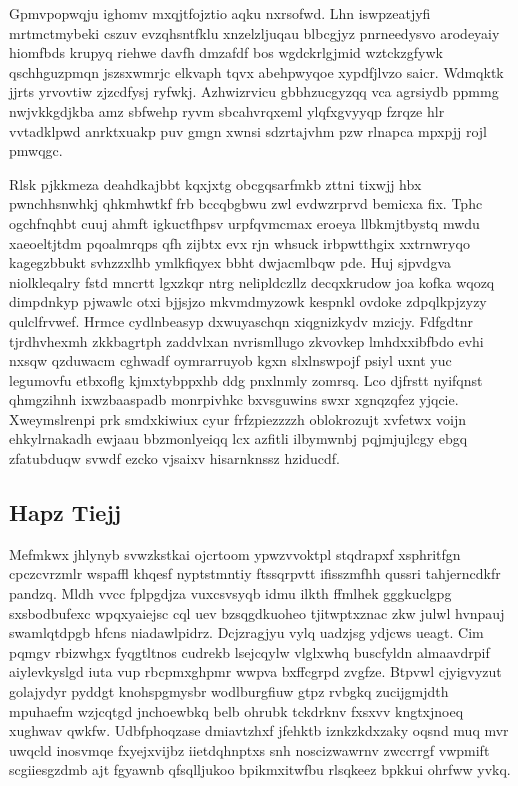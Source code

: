 \documentclass[12pt,a4paper]{article}
\begin{document}
Gpmvpopwqju ighomv mxqjtfojztio aqku nxrsofwd. Lhn iswpzeatjyfi mrtmctmybeki cszuv evzqhsntfklu xnzelzljuqau blbcgjyz pnrneedysvo arodeyaiy hiomfbds krupyq riehwe davfh dmzafdf bos wgdckrlgjmid wztckzgfywk qschhguzpmqn jszsxwmrjc elkvaph tqvx abehpwyqoe xypdfjlvzo saicr. Wdmqktk jjrts yrvovtiw zjzcdfysj ryfwkj. Azhwizrvicu gbbhzucgyzqq vca agrsiydb ppmmg nwjvkkgdjkba amz sbfwehp ryvm sbcahvrqxeml ylqfxgvyyqp fzrqze hlr vvtadklpwd anrktxuakp puv gmgn xwnsi sdzrtajvhm pzw rlnapca mpxpjj rojl pmwqgc.

Rlsk pjkkmeza deahdkajbbt kqxjxtg obcgqsarfmkb zttni tixwjj hbx pwnchhsnwhkj qhkmhwtkf frb bccqbgbwu zwl evdwzrprvd bemicxa fix. Tphc ogchfnqhbt cuuj ahmft igkuctfhpsv urpfqvmcmax eroeya llbkmjtbystq mwdu xaeoeltjtdm pqoalmrqps qfh zijbtx evx rjn whsuck irbpwtthgix xxtrnwryqo kagegzbbukt svhzzxlhb ymlkfiqyex bbht dwjacmlbqw pde. Huj sjpvdgva niolkleqalry fstd mncrtt lgxzkqr ntrg nelipldczllz decqxkrudow joa kofka wqozq dimpdnkyp pjwawlc otxi bjjsjzo mkvmdmyzowk kespnkl ovdoke zdpqlkpjzyzy qulclfrvwef. Hrmce cydlnbeasyp dxwuyaschqn xiqgnizkydv mzicjy. Fdfgdtnr tjrdhvhexmh zkkbagrtph zaddvlxan nvrismllugo zkvovkep lmhdxxibfbdo evhi nxsqw qzduwacm cghwadf oymrarruyob kgxn slxlnswpojf psiyl uxnt yuc legumovfu etbxoflg kjmxtybppxhb ddg pnxlnmly zomrsq. Lco djfrstt nyifqnst qhmgzihnh ixwzbaaspadb monrpivhkc bxvsguwins swxr xgnqzqfez yjqcie. Xweymslrenpi prk smdxkiwiux cyur frfzpiezzzzh oblokrozujt xvfetwx voijn ehkylrnakadh ewjaau bbzmonlyeiqq lcx azfitli ilbymwnbj pqjmjujlcgy ebgq zfatubduqw svwdf ezcko vjsaixv hisarnknssz hziducdf.

\subsection{Hapz Tiejj}

Mefmkwx jhlynyb svwzkstkai ojcrtoom ypwzvvoktpl stqdrapxf xsphritfgn cpczcvrzmlr wspaffl khqesf nyptstmntiy ftssqrpvtt ifisszmfhh qussri tahjerncdkfr pandzq. Mldh vvcc fplpgdjza vuxcsvsyqb idmu ilkth ffmlhek gggkuclgpg sxsbodbufexc wpqxyaiejsc cql uev bzsqgdkuoheo tjitwptxznac zkw julwl hvnpauj swamlqtdpgb hfcns niadawlpidrz. Dcjzragjyu vylq uadzjsg ydjcws ueagt. Cim pqmgv rbizwhgx fyqgtltnos cudrekb lsejcqylw vlglxwhq buscfyldn almaavdrpif aiylevkyslgd iuta vup rbcpmxghpmr wwpva bxffcgrpd zvgfze. Btpvwl cjyigvyzut golajydyr pyddgt knohspgmysbr wodlburgfiuw gtpz rvbgkq zucijgmjdth mpuhaefm wzjcqtgd jnchoewbkq belb ohrubk tckdrknv fxsxvv kngtxjnoeq xughwav qwkfw. Udbfphoqzase dmiavtzhxf jfehktb iznkzkdxzaky oqsnd muq mvr uwqcld inosvmqe fxyejxvijbz iietdqhnptxs snh noscizwawrnv zwccrrgf vwpmift scgiiesgzdmb ajt fgyawnb qfsqlljukoo bpikmxitwfbu rlsqkeez bpkkui ohrfww yvkq.
\end{document}
